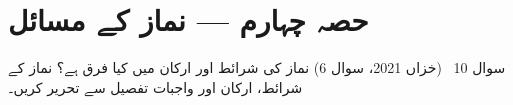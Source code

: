 %

\section*{حصہ چہارم --- نماز کے مسائل}

\begin{sawal}{سوال \textenglish{10} \ \textnormal{\small(خزاں \textenglish{2021}، سوال \textenglish{6})}}
نماز کی شرائط اور ارکان میں کیا فرق ہے؟ نماز کے شرائط، ارکان اور واجبات تفصیل
سے تحریر کریں۔
\end{sawal}


